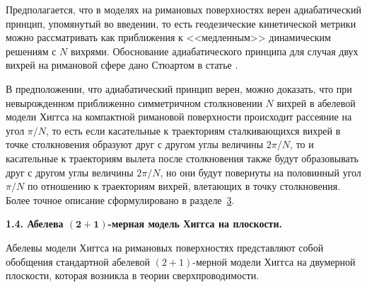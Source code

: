











Предполагается, что в моделях на римановых поверхностях верен адиабатический принцип, упомянутый во введении, то есть  геодезические кинетической метрики можно рассматривать как приближения к <<медленным>> динамическим решениям с $N$ вихрями. Обоснование адиабатического принципа для случая двух вихрей на римановой сфере дано Стюартом в статье \cite{palv:st2}.



В предположении, что адиабатический принцип верен, можно доказать, что при невырожденном приближенно симметричном столкновении $N$ вихрей в абелевой модели Хиггса на компактной римановой поверхности происходит рассеяние на угол $\pi/N$, то есть если касательные к траекториям сталкивающихся вихрей в точке столкновения образуют друг с другом углы величины $2\pi/N$, то и касательные к траекториям вылета после столкновения также будут образовывать друг с другом углы величины $2\pi/N$, но они будут повернуты на половинный угол $\pi/N$ по отношению к траекториям вихрей, влетающих в точку столкновения. Более точное описание сформулировано в разделе~\hyperlink{localscattering}{3}.





\smallskip

\textbf{1.4. Абелева $\boldsymbol{(2+1)}$-мерная модель Хиггса на плоскости.}

Абелевы модели Хиггса на римановых поверхностях представляют собой обобщения стандартной абелевой $(2+1)$-мерной модели Хиггса на двумерной плоскости, которая возникла в теории сверхпроводимости. 

